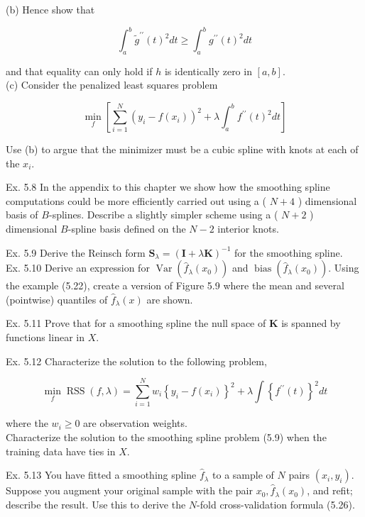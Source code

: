 \documentclass[10pt]{article}
\begin{document}
(b) Hence show that

$$
\int_{a}^{b} \tilde{g}^{\prime \prime}(t)^{2} d t \geq \int_{a}^{b} g^{\prime \prime}(t)^{2} d t
$$

and that equality can only hold if $h$ is identically zero in $[a, b]$.\\
(c) Consider the penalized least squares problem

$$
\min _{f}\left[\sum_{i=1}^{N}\left(y_{i}-f\left(x_{i}\right)\right)^{2}+\lambda \int_{a}^{b} f^{\prime \prime}(t)^{2} d t\right]
$$

Use (b) to argue that the minimizer must be a cubic spline with knots at each of the $x_{i}$.

Ex. 5.8 In the appendix to this chapter we show how the smoothing spline computations could be more efficiently carried out using a ( $N+4$ ) dimensional basis of $B$-splines. Describe a slightly simpler scheme using a ( $N+2$ ) dimensional $B$-spline basis defined on the $N-2$ interior knots.

Ex. 5.9 Derive the Reinsch form $\mathbf{S}_{\lambda}=(\mathbf{I}+\lambda \mathbf{K})^{-1}$ for the smoothing spline.\\
Ex. 5.10 Derive an expression for $\operatorname{Var}\left(\hat{f}_{\lambda}\left(x_{0}\right)\right)$ and $\operatorname{bias}\left(\hat{f}_{\lambda}\left(x_{0}\right)\right)$. Using the example (5.22), create a version of Figure 5.9 where the mean and several (pointwise) quantiles of $\hat{f}_{\lambda}(x)$ are shown.

Ex. 5.11 Prove that for a smoothing spline the null space of $\mathbf{K}$ is spanned by functions linear in $X$.

Ex. 5.12 Characterize the solution to the following problem,


\begin{equation*}
\min _{f} \operatorname{RSS}(f, \lambda)=\sum_{i=1}^{N} w_{i}\left\{y_{i}-f\left(x_{i}\right)\right\}^{2}+\lambda \int\left\{f^{\prime \prime}(t)\right\}^{2} d t \tag{5.73}
\end{equation*}


where the $w_{i} \geq 0$ are observation weights.\\
Characterize the solution to the smoothing spline problem (5.9) when the training data have ties in $X$.

Ex. 5.13 You have fitted a smoothing spline $\hat{f}_{\lambda}$ to a sample of $N$ pairs $\left(x_{i}, y_{i}\right)$. Suppose you augment your original sample with the pair $x_{0}, \hat{f}_{\lambda}\left(x_{0}\right)$, and refit; describe the result. Use this to derive the $N$-fold cross-validation formula (5.26).
\end{document}
